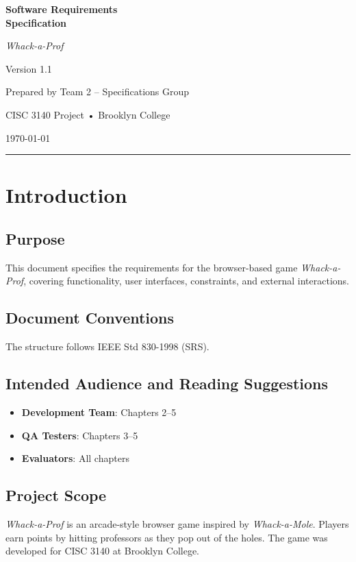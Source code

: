 \documentclass[11pt]{scrreprt}
\date{\today}
\newcommand*{\product}{\textit{Whack-a-Prof}\xspace}
\def\version{1.1}
\begin{document}
\begin{titlepage}
  \centering
  {\Huge\bfseries Software Requirements\\[4pt] Specification\par}
  \vspace{1.5cm}
  {\LARGE \product\par}
  \vfill
  {\Large Version \version\par}
  \vspace{1cm}
  {\large Prepared by Team 2 – Specifications Group\par}
  {\large CISC 3140 Project • Brooklyn College\par}
  {\large \today}
  \vfill
  \rule{\linewidth}{0.5mm}
\end{titlepage}

\tableofcontents
\clearpage

\chapter{Introduction}

\section{Purpose}
This document specifies the requirements for the browser-based game \product, covering functionality, user interfaces, constraints, and external interactions.

\section{Document Conventions}
The structure follows IEEE Std 830-1998 (SRS).

\section{Intended Audience and Reading Suggestions}
\begin{itemize}
  \item \textbf{Development Team}: Chapters 2–5
  \item \textbf{QA Testers}: Chapters 3–5
  \item \textbf{Evaluators}: All chapters
\end{itemize}

\section{Project Scope}
\product is an arcade-style browser game inspired by \emph{Whack-a-Mole}. Players earn points by hitting professors as they pop out of the holes. The game was developed for CISC 3140 at Brooklyn College.
\end{document}
